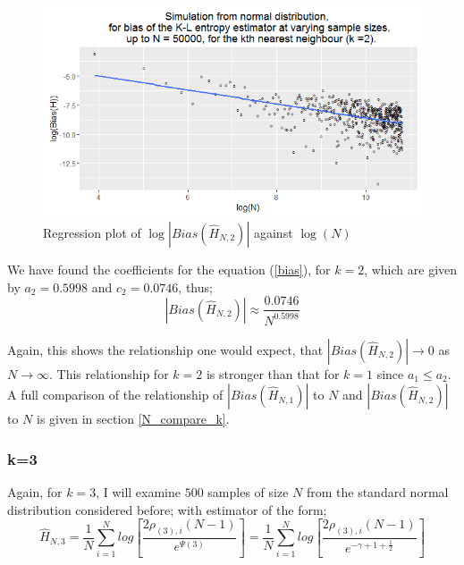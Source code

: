 \documentclass{article}
\begin{document}
\begin{figure}
  \begin{center}
    \includegraphics[width=\textwidth]{./Graphs/Normal_k=2_plot.png}
  \end{center}
\caption{Regression plot of $\log|Bias(\hat{H}_{N, 2})|$ against $\log(N)$}
  \label{normal_k=2_graph}
\end{figure}

We have found the coefficients for the equation (\ref{bias}), for $k=2$, which are given by $a_{2} = 0.5998$ and $c_{2} = 0.0746$, thus;
\begin{equation}
|Bias(\hat{H}_{N, 2})| \approx \frac{0.0746}{N^{0.5998}} \nonumber
\end{equation}

Again, this shows the relationship one would expect, that $|Bias(\hat{H}_{N, 2})| \to 0$ as $N \to \infty$. This relationship for $k=2$ is stronger than that for $k=1$ since $a_{1} \leq a_{2}$. A full comparison of the relationship of $|Bias(\hat{H}_{N, 1})|$ to $N$ and $|Bias(\hat{H}_{N, 2})|$ to $N$ is given in section \ref{N_compare_k}.




\subsubsection{k=3} \label{N_k=3}
Again, for $k=3$, I will examine $500$ samples of size $N$ from the standard normal distribution considered before; with estimator of the form;
\begin{equation}
\hat{H}_{N, 3} = \frac{1}{N} \sum_{i=1}^{N} log \left[ \frac{2\rho_{(3),i} (N-1)}{e^{\Psi(3)}} \right] = \frac{1}{N} \sum_{i=1}^{N} log \left[ \frac{2\rho_{(3),i} (N-1)}{e^{-\gamma + 1 + \frac{1}{2}}} \right] \nonumber
\end{equation}
\end{document}
